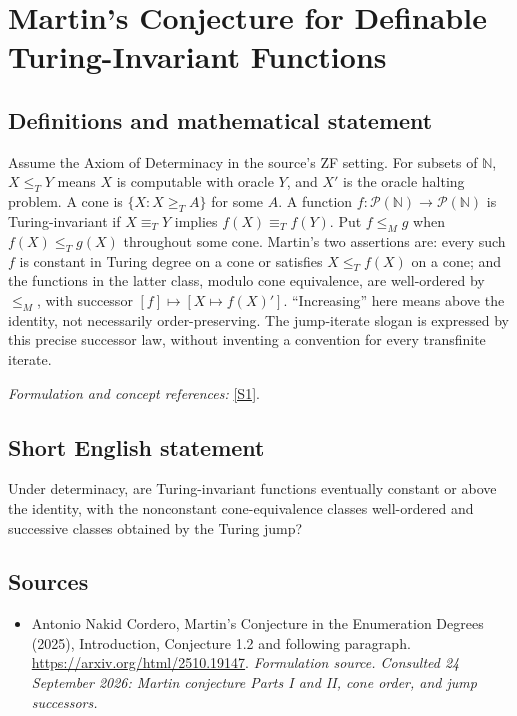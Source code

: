 \documentclass[11pt]{article}
\begin{document}
\section*{\texorpdfstring{Martin's Conjecture for Definable Turing-Invariant Functions}{Martin's Conjecture for Definable Turing-Invariant Functions}}\label{statement}
\subsection{Definitions and mathematical statement}
Assume the Axiom of Determinacy in the source's ZF setting. For subsets of ${\mathbb{N}}$, $X\le_TY$ means $X$ is computable with oracle $Y$, and $X'$ is the oracle halting problem. A cone is $\{X:X\ge_TA\}$ for some $A$. A function $f:\mathcal P({\mathbb{N}})\to\mathcal P({\mathbb{N}})$ is Turing-invariant if $X\equiv_TY$ implies $f(X)\equiv_Tf(Y)$. Put $f\le_Mg$ when $f(X)\le_Tg(X)$ throughout some cone. Martin's two assertions are: every such $f$ is constant in Turing degree on a cone or satisfies $X\le_Tf(X)$ on a cone; and the functions in the latter class, modulo cone equivalence, are well-ordered by $\le_M$, with successor $[f]\mapsto[X\mapsto f(X)']$. ``Increasing'' here means above the identity, not necessarily order-preserving. The jump-iterate slogan is expressed by this precise successor law, without inventing a convention for every transfinite iterate.
\par\smallskip\textit{Formulation and concept references:} \href{https://arxiv.org/html/2510.19147}{[S1]}.

\subsection{Short English statement}
Under determinacy, are Turing-invariant functions eventually constant or above the identity, with the nonconstant cone-equivalence classes well-ordered and successive classes obtained by the Turing jump?
\subsection{Sources}
\begin{itemize}
\item[S1]Antonio Nakid Cordero, Martin's Conjecture in the Enumeration Degrees (2025), Introduction, Conjecture 1.2 and following paragraph.
\url{https://arxiv.org/html/2510.19147}.
\textit{Formulation source. Consulted 24 September 2026: Martin conjecture Parts I and II, cone order, and jump successors.}
\end{itemize}
\end{document}
